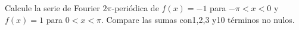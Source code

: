 Calcule la serie de Fourier $2\pi$-periódica de $f(x)=-1$ para $-\pi<x<0$ y $f(x)=1$ para $0<x<\pi$. Compare las sumas con1,2,3 y10 términos no nulos.
